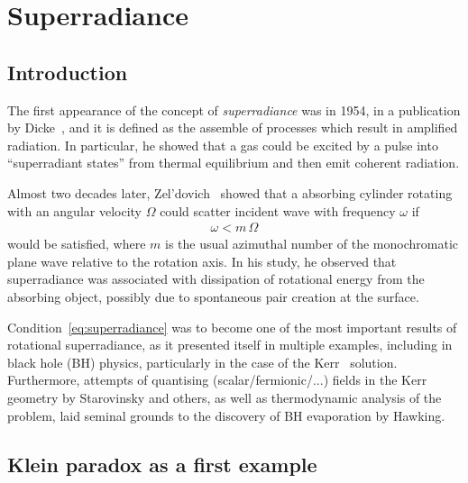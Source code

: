 
\chapter{Superradiance} %
\label{Chapter1}


\section{Introduction}

The first appearance of the concept of \emph{superradiance} was in 1954, in a publication by Dicke~\cite{Dicke1954}, and it is defined as the assemble of processes which result in amplified radiation. In particular, he showed that a gas could be excited by a pulse into ``superradiant states'' from thermal equilibrium and then emit coherent radiation.

Almost two decades later, Zel'dovich~\cite{Zeldovich1971,Zeldovich1972} showed that a absorbing cylinder rotating with an angular velocity $\Omega$ could scatter incident wave with frequency $\omega$ if
\begin{align}
    \omega < m\, \Omega
    \label{eq:superradiance}
\end{align}
would be satisfied, where $m$ is the usual azimuthal number of the monochromatic plane wave relative to the rotation axis.
In his study, he observed that superradiance was associated with dissipation of rotational energy from the absorbing object, possibly due to spontaneous pair creation at the surface. 

Condition~\eqref{eq:superradiance} was to become one of the most important results of rotational superradiance, as it presented itself in multiple examples, including in black hole (BH) physics, particularly in the case of the Kerr~\cite{Kerr19XX} solution. 
Furthermore, attempts of quantising (scalar/fermionic/...) fields in the Kerr geometry by Starovinsky and others, as well as thermodynamic analysis of the problem, laid seminal grounds to the discovery of BH evaporation by Hawking. 


\section{Klein paradox as a first example}


